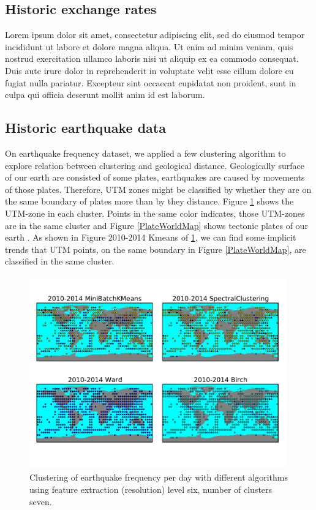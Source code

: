 \documentclass{article}
\begin{document}
\subsection{Historic exchange rates}
Lorem ipsum dolor sit amet, consectetur adipiscing elit, sed do eiusmod tempor incididunt ut labore et dolore magna aliqua. Ut enim ad minim veniam, quis nostrud exercitation ullamco laboris nisi ut aliquip ex ea commodo consequat. Duis aute irure dolor in reprehenderit in voluptate velit esse cillum dolore eu fugiat nulla pariatur. Excepteur sint occaecat cupidatat non proident, sunt in culpa qui officia deserunt mollit anim id est laborum.


\subsection{Historic earthquake data}
On earthquake frequency dataset, we applied a few clustering algorithm to explore relation between clustering and geological distance. Geologically surface of our earth are consisted of some plates, earthquakes are caused by movements of those plates. Therefore, UTM zones might be classified by whether they are on the same boundary of plates more than by they distance.
Figure \ref{EarthquakeWorldMap} shows the UTM-zone in each cluster. Points in the same color indicates, those UTM-zones are in the same cluster and Figure \ref{PlateWorldMap} shows tectonic plates of our earth \cite{WTP15}. As shown in Figure 2010-2014 Kmeans of \ref{EarthquakeWorldMap},
we can find some implicit trends that UTM points, on the same boundary in Figure \ref{PlateWorldMap}, are classified in the same cluster.

\begin{figure}
\includegraphics[width=0.99\textwidth]{../earthquakedata/output_map_plot/grid(year=2010-2014,level=6,number_of_cluster=7).pdf}
\caption{Clustering of earthquake frequency per day with different algorithms
using feature extraction (resolution) level six, number of clusters seven.}
\label{EarthquakeWorldMap}
\end{figure}
\end{document}
